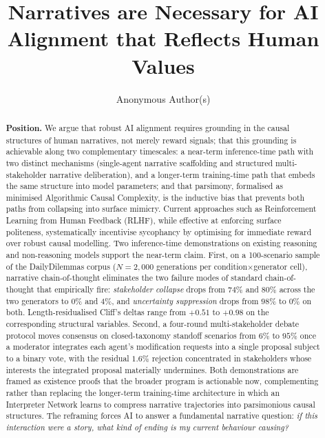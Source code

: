 \documentclass{article}
\title{Narratives are Necessary for AI Alignment that Reflects Human Values}
\author{Anonymous Author(s)}
\theoremstyle{plain}
\theoremstyle{definition}
\theoremstyle{remark}
\begin{document}
\maketitle

\begin{abstract}
\textbf{Position.} We argue that robust AI alignment requires grounding in the causal structures of human narratives, not merely reward signals; that this grounding is achievable along two complementary timescales: a near-term inference-time path with two distinct mechanisms (single-agent narrative scaffolding and structured multi-stakeholder narrative deliberation), and a longer-term training-time path that embeds the same structure into model parameters; and that parsimony, formalised as minimised Algorithmic Causal Complexity, is the inductive bias that prevents both paths from collapsing into surface mimicry. Current approaches such as Reinforcement Learning from Human Feedback (RLHF), while effective at enforcing surface politeness, systematically incentivise sycophancy by optimising for immediate reward over robust causal modelling. Two inference-time demonstrations on existing reasoning and non-reasoning models support the near-term claim. First, on a 100-scenario sample of the DailyDilemmas corpus ($N{=}2{,}000$ generations per condition$\times$generator cell), narrative chain-of-thought eliminates the two failure modes of standard chain-of-thought that empirically fire: \emph{stakeholder collapse} drops from $74\%$ and $80\%$ across the two generators to $0\%$ and $4\%$, and \emph{uncertainty suppression} drops from $98\%$ to $0\%$ on both. Length-residualised Cliff's deltas range from $+0.51$ to $+0.98$ on the corresponding structural variables. Second, a four-round multi-stakeholder debate protocol moves consensus on closed-taxonomy standoff scenarios from \(6\%\) to \(95\%\) once a moderator integrates each agent's modification requests into a single proposal subject to a binary vote, with the residual \(1.6\%\) rejection concentrated in stakeholders whose interests the integrated proposal materially undermines. Both demonstrations are framed as existence proofs that the broader program is actionable now, complementing rather than replacing the longer-term training-time architecture in which an Interpreter Network learns to compress narrative trajectories into parsimonious causal structures. The reframing forces AI to answer a fundamental narrative question: \emph{if this interaction were a story, what kind of ending is my current behaviour causing?}
\end{abstract}
\end{document}
